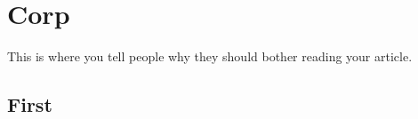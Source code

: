 \chapter{Corp}
This is where you tell people why they should bother reading your article.

\section{First}